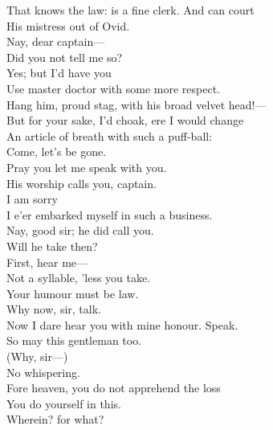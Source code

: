\documentclass[a4paper,oneside,12pt]{memoir}
\begin{document}
\begin{drama*}
That knows the law: is a fine clerk. And can court\\
His mistress out of Ovid.\\
\dapperspeaks {} Nay, dear captain---\\
\facespeaks Did you not tell me so?\\
\dapperspeaks {} Yes; but I'd have you\\
Use master doctor with some more respect.\\
\facespeaks Hang him, proud stag, with his broad velvet head!---\\
But for your sake, I'd choak, ere I would change\\
An article of breath with such a puff-ball:\\
Come, let's be gone.\\
\subtlespeaks {} Pray you let me speak with you.\\
\dapperspeaks His worship calls you, captain.\\
\facespeaks {} I am sorry\\
I e'er embarked myself in such a business.\\
\dapperspeaks Nay, good sir; he did call you.\\
\facespeaks {} Will he take then?\\
\subtlespeaks First, hear me---\\
\facespeaks {} Not a syllable, 'less you take.\\
\subtlespeaks Your humour must be law.\\
\facespeaks {} Why now, sir, talk.\\
Now I dare hear you with mine honour. Speak.\\
So may this gentleman too.\\
\subtlespeaks {} (Why, sir---)\\
\facespeaks {} No whispering.\\
\subtlespeaks Fore heaven, you do not apprehend the loss\\
You do yourself in this.\\
\facespeaks {} Wherein? for what?\\

\end{drama*}
\end{document}
